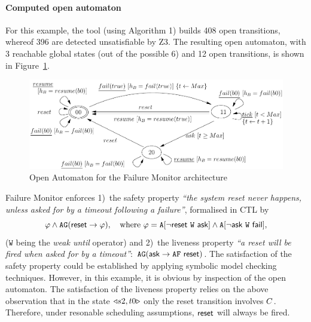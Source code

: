 \documentclass[smallcondensed]{svjour3}
\newcommand{\noteEM}[2][color=blue!40, size=\tiny]{\todo[#1]{{\bf Eric: } {#2}}}
\newcommand{\OTvar}{\texttt}
\newcommand{\ie}[1][\ ]{i.e.#1}
\begin{document}
\paragraph{Computed open automaton}

For this example, the tool (using Algorithm 1) builds 408 open transitions, whereof 396
are detected unsatisfiable by Z3.  The resulting open automaton, with
3 reachable global states (out of the possible 6) and 12 open
transitions, is shown in Figure~\ref{schema:resultOA1}.

\begin{figure}[t]
  \centerline{\includegraphics[width=12cm]{ActaXFIG/FailureTimerOA-v2-2}}
  \caption{Open Automaton for the Failure Monitor architecture}
  \label{schema:resultOA1}
\end{figure}

%

Failure Monitor enforces \noteEM{NO!!!}1)~the safety property \emph{``the
  system reset never happens, unless asked for by a timeout
  following a failure''}, formalised in CTL by
%
\[
\varphi \land \mathtt{AG} (\PortReset \rightarrow \varphi),
\quad\text{where}\
%
\varphi = \mathtt{A} [\lnot \PortReset\ \mathtt{W}\ \PortAsk]
\land \mathtt{A} [\lnot \PortAsk\ \mathtt{W}\ \PortFail],
\]
%
($\mathtt{W}$ being the \emph{weak until} operator) and 2)~the
liveness property \emph{``a reset will be fired when asked for by
  a timeout''}:
%
$\mathtt{AG}(\mathsf{ask} \rightarrow \mathtt{AF}\ \mathsf{reset})$.
%
The satisfaction of the safety property could be established by
applying symbolic model checking techniques.  However, in this
example, it is obvious by inspection of the open automaton.  The
satisfaction of the liveness property relies on the above observation
that in the state $\triangleleft{s2,t0}\triangleright$ only the reset transition involves
$C$.  Therefore, under resonable scheduling assumptions,
$\mathsf{reset}$ will always be fired.
\end{document}
